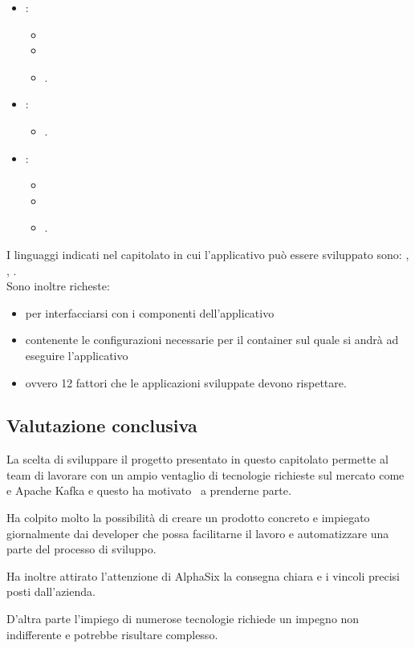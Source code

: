     \begin{itemize}
        \item {}:
        \begin{itemize}
            \item {}
            \item {}
            \item {}.
        \end{itemize}
        \item {}:
        \begin{itemize}
            \item {}.
        \end{itemize}
        \item {}:
        \begin{itemize}
            \item {}
            \item {}
            \item {}.
        \end{itemize}
    \end{itemize}
    I linguaggi indicati nel capitolato in cui l'applicativo può essere sviluppato sono: , , .\\
    Sono inoltre richeste:
    \begin{itemize}
        \item {} per interfacciarsi con i componenti dell'applicativo
        \item {} contenente le configurazioni necessarie per il container sul quale si andrà ad eseguire l'applicativo
        \item {} ovvero 12 fattori che le applicazioni sviluppate devono rispettare.
    \end{itemize}

    \subsection{Valutazione conclusiva}
    La scelta di sviluppare il progetto presentato in questo capitolato permette al team di lavorare con un ampio ventaglio di tecnologie
    richieste sul mercato come  e Apache Kafka e questo ha motivato \gruppo\ a prenderne parte.\par
    Ha colpito molto la possibilità di creare un prodotto concreto e impiegato giornalmente dai developer che possa facilitarne il lavoro
    e automatizzare una parte del processo di sviluppo.\par
    Ha inoltre attirato l'attenzione di AlphaSix la consegna chiara e i vincoli precisi posti dall'azienda.\par
    D'altra parte l'impiego di numerose tecnologie richiede un impegno non indifferente e potrebbe risultare complesso.
